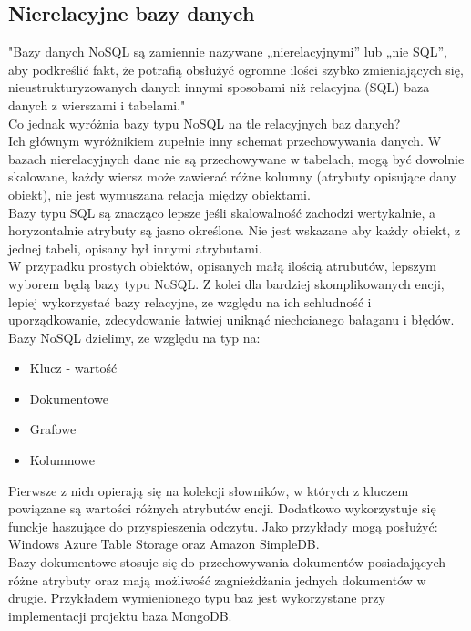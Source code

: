 \documentclass[12pt]{article}
\begin{document}
\begin{sloppypar}
{  \subsection{Nierelacyjne bazy danych}
  {
    "Bazy danych NoSQL są zamiennie nazywane „nierelacyjnymi” lub „nie SQL”, aby podkreślić fakt, że potrafią obsłużyć ogromne ilości szybko zmieniających się, 
    nieustrukturyzowanych danych innymi sposobami niż relacyjna (SQL) baza danych z wierszami i tabelami." \cite{mc-nosql}\\
    Co jednak wyróżnia bazy typu NoSQL na tle relacyjnych baz danych?\\
    Ich głównym wyróżnikiem zupełnie inny schemat przechowywania danych. W bazach nierelacyjnych dane nie są przechowywane w tabelach, mogą być dowolnie skalowane, 
    każdy wiersz może zawierać różne kolumny (atrybuty opisujące dany obiekt), nie jest wymuszana relacja między obiektami.\\
    Bazy typu SQL są znacząco lepsze jeśli skalowalność zachodzi wertykalnie, a horyzontalnie atrybuty są jasno określone. Nie jest wskazane aby każdy obiekt, z jednej 
    tabeli, opisany był innymi atrybutami.\\
    W przypadku prostych obiektów, opisanych małą ilością atrubutów, lepszym wyborem będą bazy typu NoSQL. Z kolei dla bardziej skomplikowanych encji, lepiej wykorzystać 
    bazy relacyjne, ze względu na ich schludność i uporządkowanie, zdecydowanie łatwiej uniknąć niechcianego bałaganu i błędów.\\
    Bazy NoSQL dzielimy, ze względu na typ na\cite{agh-nosql}:
    \begin{itemize}
      \item Klucz - wartość
      \item Dokumentowe
      \item Grafowe
      \item Kolumnowe
    \end{itemize}
    Pierwsze z nich opierają się na kolekcji słowników, w których z kluczem powiązane są wartości różnych atrybutów encji. Dodatkowo wykorzystuje się funckje haszujące 
    do przyspieszenia odczytu. Jako przykłady mogą posłużyć: Windows Azure Table Storage oraz Amazon SimpleDB.\\
    Bazy dokumentowe stosuje się do przechowywania dokumentów posiadających różne atrybuty oraz mają możliwość zagnieżdżania jednych dokumentów w drugie. Przykładem 
    wymienionego typu baz jest wykorzystane przy implementacji projektu baza MongoDB.\\
}}
\end{sloppypar}
\end{document}
